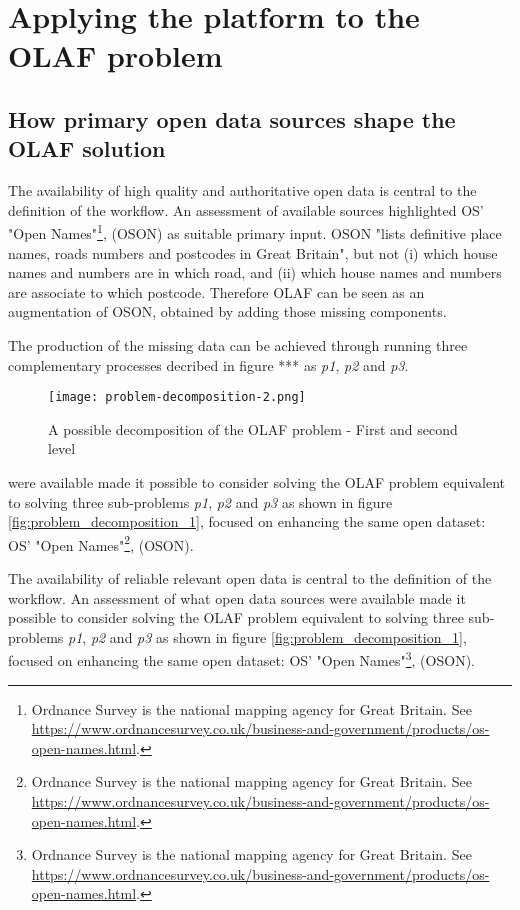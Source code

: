 \section{Applying the platform to the OLAF problem}
\label{crowdsourcing-olaf}

\subsection{How primary open data sources shape the OLAF solution}

The availability of high quality and authoritative open data is central to the definition of the workflow. An assessment of available sources highlighted OS' "Open Names"\footnote{Ordnance Survey is the national mapping agency for Great Britain. See \url{https://www.ordnancesurvey.co.uk/business-and-government/products/os-open-names.html}.}, (OSON) as suitable primary input. OSON "lists definitive place names, roads numbers and postcodes in Great Britain", but not (i) which house names and numbers are in which road, and (ii) which house names and numbers are associate to which postcode. Therefore OLAF can be seen as an augmentation of OSON, obtained by adding those missing components.

The production of the missing data can be achieved through running three complementary processes decribed in figure *** as {\it p1}, {\it p2} and {\it p3}. 

\begin{figure}
	\texttt{[image: problem-decomposition-2.png]}
	\caption{A possible decomposition of the OLAF problem - First and second level}
	\label{fig:problem_decomposition_2}
\end{figure}



were available made it possible to consider solving the OLAF problem equivalent to solving three sub-problems {\it p1}, {\it p2} and {\it p3} as shown in figure \ref{fig:problem_decomposition_1}, focused on enhancing the same open dataset: OS' "Open Names"\footnote{Ordnance Survey is the national mapping agency for Great Britain. See \url{https://www.ordnancesurvey.co.uk/business-and-government/products/os-open-names.html}.}, (OSON).


The availability of reliable relevant open data is central to the definition of the workflow. An assessment of what open data sources were available made it possible to consider solving the OLAF problem equivalent to solving three sub-problems {\it p1}, {\it p2} and {\it p3} as shown in figure \ref{fig:problem_decomposition_1}, focused on enhancing the same open dataset: OS' "Open Names"\footnote{Ordnance Survey is the national mapping agency for Great Britain. See \url{https://www.ordnancesurvey.co.uk/business-and-government/products/os-open-names.html}.}, (OSON).

